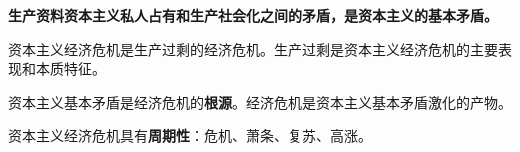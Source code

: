 \textbf{{生产资料资本主义私人占有和生产社会化之间的矛盾，是资本主义的基本矛盾。}}

资本主义经济危机是生产过剩的经济危机。生产过剩是资本主义经济危机的主要表现和本质特征。

{资本主义基本矛盾是经济危机的}\textbf{根源}{。经济危机是资本主义基本矛盾激化的产物。}

{资本主义经济危机具有}\textbf{{周期性}}{：}危机、萧条、复苏、高涨{。}
